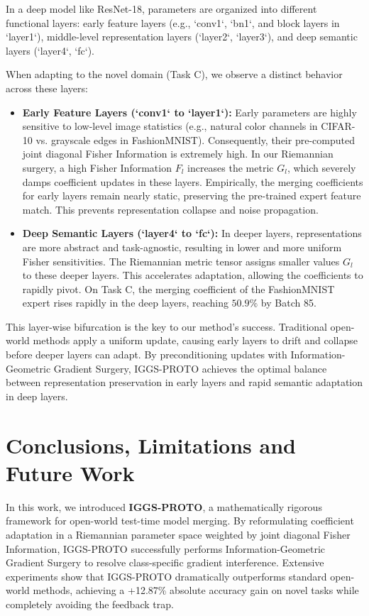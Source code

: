 \documentclass{article}
\theoremstyle{plain}
\theoremstyle{definition}
\theoremstyle{remark}
\begin{document}
In a deep model like ResNet-18, parameters are organized into different functional layers: early feature layers (e.g., `conv1`, `bn1`, and block layers in `layer1`), middle-level representation layers (`layer2`, `layer3`), and deep semantic layers (`layer4`, `fc`). 

When adapting to the novel domain (Task C), we observe a distinct behavior across these layers:
\begin{itemize}
    \item \textbf{Early Feature Layers (`conv1` to `layer1`):} Early parameters are highly sensitive to low-level image statistics (e.g., natural color channels in CIFAR-10 vs. grayscale edges in FashionMNIST). Consequently, their pre-computed joint diagonal Fisher Information is extremely high. In our Riemannian surgery, a high Fisher Information $F_{l}$ increases the metric $G_l$, which severely damps coefficient updates in these layers. Empirically, the merging coefficients for early layers remain nearly static, preserving the pre-trained expert feature match. This prevents representation collapse and noise propagation.
    \item \textbf{Deep Semantic Layers (`layer4` to `fc`):} In deeper layers, representations are more abstract and task-agnostic, resulting in lower and more uniform Fisher sensitivities. The Riemannian metric tensor assigns smaller values $G_l$ to these deeper layers. This accelerates adaptation, allowing the coefficients to rapidly pivot. On Task C, the merging coefficient of the FashionMNIST expert rises rapidly in the deep layers, reaching $50.9\%$ by Batch 85.
\end{itemize}

This layer-wise bifurcation is the key to our method's success. Traditional open-world methods apply a uniform update, causing early layers to drift and collapse before deeper layers can adapt. By preconditioning updates with Information-Geometric Gradient Surgery, IGGS-PROTO achieves the optimal balance between representation preservation in early layers and rapid semantic adaptation in deep layers.

\section{Conclusions, Limitations and Future Work}
In this work, we introduced \textbf{IGGS-PROTO}, a mathematically rigorous framework for open-world test-time model merging. By reformulating coefficient adaptation in a Riemannian parameter space weighted by joint diagonal Fisher Information, IGGS-PROTO successfully performs Information-Geometric Gradient Surgery to resolve class-specific gradient interference. Extensive experiments show that IGGS-PROTO dramatically outperforms standard open-world methods, achieving a +12.87\% absolute accuracy gain on novel tasks while completely avoiding the feedback trap.
\end{document}

